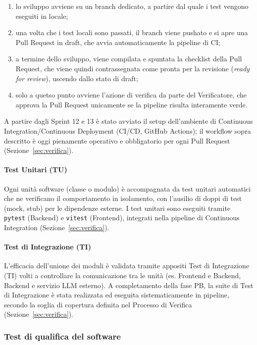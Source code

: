 \begin{enumerate}
    \item lo sviluppo avviene su un branch dedicato, a partire dal quale i test vengono eseguiti in locale;
    \item una volta che i test locali sono passati, il branch viene pushato e si apre una Pull Request in draft, che avvia automaticamente la pipeline di CI;
    \item a termine dello sviluppo, viene compilata e spuntata la checklist della Pull Request, che viene quindi contrassegnata come pronta per la revisione (\textit{ready for review}), uscendo dallo stato di draft;
    \item solo a quetso punto avviene l'azione di verifica da parte del Verificatore, che approva la Pull Request unicamente se la pipeline risulta interamente verde.
\end{enumerate}
 
A partire dagli Sprint 12 e 13 è stato avviato il setup dell'ambiente di Continuous Integration/Continuous Deployment (CI/CD, GitHub Actions); il workflow sopra descritto è oggi pienamente operativo e obbligatorio per ogni Pull Request (Sezione~\ref{sec:verifica}).
\paragraph{Test Unitari (TU)}
Ogni unità software (classe o modulo) è accompagnata da test unitari automatici che ne verificano il comportamento in isolamento, con l'ausilio di doppi di test (mock, stub) per le dipendenze esterne. I test unitari sono eseguiti tramite \texttt{pytest} (Backend) e \texttt{vitest} (Frontend), integrati nella pipeline di Continuous Integration (Sezione~\ref{sec:verifica}).

\paragraph{Test di Integrazione (TI)}
L'efficacia dell'unione dei moduli è validata tramite appositi Test di Integrazione (TI) volti a controllare la comunicazione tra le unità (es. Frontend e Backend, Backend e servizio LLM esterno). A completamento della fase PB, la suite di Test di Integrazione è stata realizzata ed eseguita sistematicamente in pipeline, secondo la soglia di copertura definita nel Processo di Verifica (Sezione~\ref{sec:verifica}).


\subsubsection{Test di qualifica del software}

